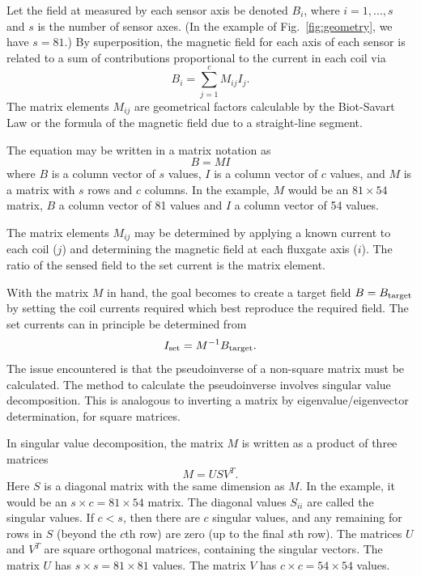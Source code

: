 \documentclass[preprint,12pt]{elsarticle}
\begin{document}
Let the field at measured by each sensor axis be denoted $B_i$, where
$i=1,...,s$ and $s$ is the number of sensor axes.  (In the example of
Fig.~\ref{fig:geometry}, we have $s=81$.)  By superposition, the
magnetic field for each axis of each sensor is related to a sum of
contributions proportional to the current in each coil via
\begin{equation}
  B_i=\sum_{j=1}^cM_{ij}I_j.
\end{equation}
The matrix elements $M_{ij}$ are geometrical factors calculable by the
Biot-Savart Law or the formula of the magnetic field due to a
straight-line segment.

The equation may be written in a matrix notation as
\begin{equation}
  B=MI
\end{equation}
where $B$ is a column vector of $s$ values, $I$ is a column vector of
$c$ values, and $M$ is a matrix with $s$ rows and $c$ columns.  In the
example, $M$ would be an $81\times 54$ matrix, $B$ a column vector of
81 values and $I$ a column vector of 54 values.

The matrix elements $M_{ij}$ may be determined by applying a known
current to each coil ($j$) and determining the magnetic field at each
fluxgate axis ($i$).  The ratio of the sensed field to the set current
is the matrix element.

With the matrix $M$ in hand, the goal becomes to create a target field
$B=B_{\rm target}$ by setting the coil currents required which best
reproduce the required field.  The set currents can in principle be
determined from
\begin{equation}
  I_{\rm set}=M^{-1}B_{\rm target}.
  \label{eq:minv}
\end{equation}
The issue encountered is that the pseudoinverse of a non-square matrix
must be calculated.  The method to calculate the pseudoinverse
involves singular value decomposition.  This is analogous to inverting
a matrix by eigenvalue/eigenvector determination, for square matrices.

In singular value decomposition, the matrix $M$ is written as a
product of three matrices
\begin{equation}
  M=USV^T.
\end{equation}
Here $S$ is a diagonal matrix with the same dimension as $M$.  In the
example, it would be an $s\times c=81\times 54$ matrix.  The diagonal
values $S_{ii}$ are called the singular values.  If $c<s$, then there
are $c$ singular values, and any remaining for rows in $S$ (beyond the
$c$th row) are zero (up to the final $s$th row).  The matrices $U$ and
$V^T$ are square orthogonal matrices, containing the singular vectors.
The matrix $U$ has $s\times s=81\times 81$ values.  The matrix $V$ has
$c\times c=54\times 54$ values.
\end{document}
